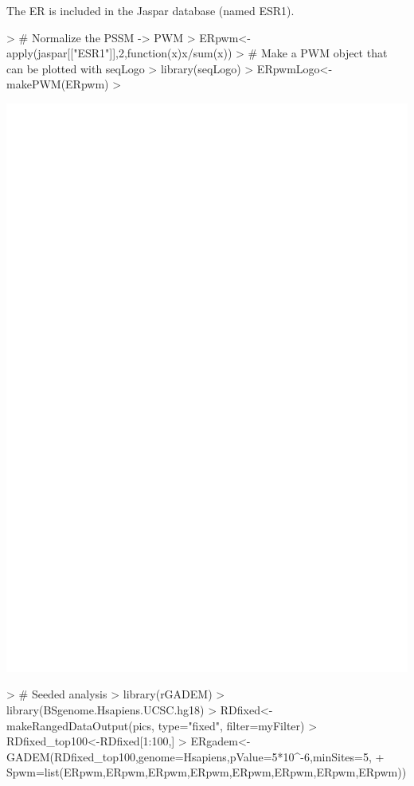 \documentclass[12pt]{article}
\begin{document}
The ER is included in the Jaspar database (named ESR1).
\begin{Schunk}
\begin{Sinput}
> # Normalize the PSSM -> PWM
> ERpwm<-apply(jaspar[["ESR1"]],2,function(x){x/sum(x)})
> # Make a PWM object that can be plotted with seqLogo
> library(seqLogo)
> ERpwmLogo<-makePWM(ERpwm)
> 
\end{Sinput}
\end{Schunk}
\includegraphics{chipData_AD-ESR1-motif-in-Jaspar-cc}

\begin{Schunk}
\begin{Sinput}
> # Seeded analysis
> library(rGADEM)
> library(BSgenome.Hsapiens.UCSC.hg18)
> RDfixed<-makeRangedDataOutput(pics, type="fixed", filter=myFilter)
> RDfixed_top100<-RDfixed[1:100,]
> ERgadem<-GADEM(RDfixed_top100,genome=Hsapiens,pValue=5*10^-6,minSites=5, 
+ Spwm=list(ERpwm,ERpwm,ERpwm,ERpwm,ERpwm,ERpwm,ERpwm,ERpwm))
\end{Sinput}
\end{Schunk}
\end{document}
